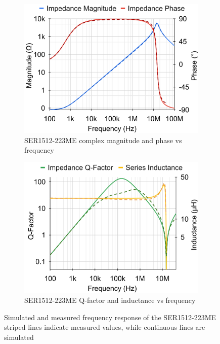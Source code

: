 \begin{figure}[H]
    \begin{subfigure}[b]{0.50\textwidth}
        \includegraphics[width=\textwidth]{Bilder/Kapitel3/SER223_BodePlot_Combined.png}
        \caption{SER1512-223ME complex magnitude and phase vs frequency}
    \end{subfigure}
    \begin{subfigure}[b]{0.50\textwidth}
        \includegraphics[width=\textwidth]{Bilder/Kapitel3/SER223_QLPlot_Combined.png}
        \caption{SER1512-223ME \ac{Q-factor} and inductance vs frequency}
    \end{subfigure}
    \caption{Simulated and measured frequency response of the SER1512-223ME\\striped lines indicate measured values, while continuous lines are simulated}
    \label{fig:bode_100_measurements_combined}							
\end{figure}

